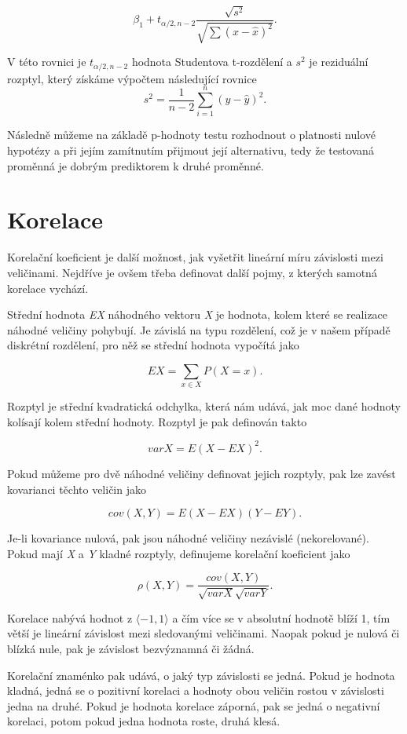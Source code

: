 \documentclass[thesis=M,czech]{FITthesis}[2022/10/08]
\begin{document}
\[\beta_1 + t_{\alpha / 2,n-2} \frac{\sqrt{s^2}}{\sqrt{\sum(x-\hat{x})^2}}.\]

V této rovnici je $t_{\alpha/2,n-2}$ hodnota Studentova t-rozdělení a $s^2$ je reziduální rozptyl, který získáme výpočtem následující rovnice
\[s^2 = \frac{1}{n-2}\sum_{i=1}^n (y-\hat{y})^2.\]

Následně můžeme na základě p-hodnoty testu rozhodnout o platnosti nulové hypotézy a při jejím zamítnutím přijmout její alternativu,  tedy že testovaná proměnná je dobrým prediktorem k druhé proměnné.
\cite{linreg}

\section{Korelace}

Korelační koeficient je další možnost, jak vyšetřit lineární míru závislosti mezi veličinami. Nejdříve je ovšem třeba definovat další pojmy, z kterých samotná korelace vychází. 

Střední hodnota \textit{EX} náhodného vektoru \textit{X} je hodnota, kolem které se realizace náhodné veličiny pohybují. Je závislá na typu rozdělení, což je v našem případě diskrétní rozdělení, pro něž se střední hodnota vypočítá jako 

\[EX = \sum_{x\in{X}}P(X = x).\]

Rozptyl je střední kvadratická odchylka, která nám udává, jak moc dané hodnoty kolísají kolem střední hodnoty. Rozptyl je pak definován takto 

\[var X = E(X - EX)^2.\]

Pokud můžeme pro dvě náhodné veličiny definovat jejich rozptyly, pak lze zavést kovarianci těchto veličin jako

\[cov(X, Y) = E(X - EX)(Y - EY).\]

Je-li kovariance nulová, pak jsou náhodné veličiny nezávislé (nekorelované). Pokud mají \textit{X} a \textit{Y} kladné rozptyly, definujeme korelační koeficient jako

\[\rho(X,Y) = \frac{cov(X,Y)}{\sqrt{varX}\sqrt{varY}}.\]

Korelace nabývá hodnot z $\langle-1,1\rangle$ a čím více se v absolutní hodnotě blíží 1, tím větší je lineární závislost mezi sledovanými veličinami. Naopak pokud je nulová či blízká nule, pak je závislost bezvýznamná či žádná.

Korelační znaménko pak udává, o jaký typ závislosti se jedná. Pokud je hodnota kladná, jedná se o pozitivní korelaci a hodnoty obou veličin rostou v závislosti jedna na druhé. Pokud je hodnota korelace záporná, pak se jedná o negativní korelaci, potom pokud jedna hodnota roste, druhá klesá. \cite{korelace}
\end{document}

